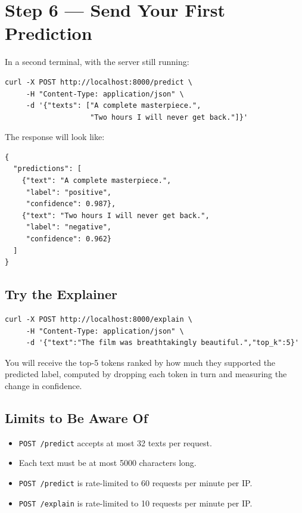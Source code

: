 \documentclass[11pt,a4paper]{article}
\begin{document}
\section{Step 6 --- Send Your First Prediction}

In a second terminal, with the server still running:

\begin{lstlisting}
curl -X POST http://localhost:8000/predict \
     -H "Content-Type: application/json" \
     -d '{"texts": ["A complete masterpiece.",
                    "Two hours I will never get back."]}'
\end{lstlisting}

\noindent The response will look like:

\begin{lstlisting}
{
  "predictions": [
    {"text": "A complete masterpiece.",
     "label": "positive",
     "confidence": 0.987},
    {"text": "Two hours I will never get back.",
     "label": "negative",
     "confidence": 0.962}
  ]
}
\end{lstlisting}

\subsection{Try the Explainer}

\begin{lstlisting}
curl -X POST http://localhost:8000/explain \
     -H "Content-Type: application/json" \
     -d '{"text":"The film was breathtakingly beautiful.","top_k":5}'
\end{lstlisting}

\noindent You will receive the top-5 tokens ranked by how much they supported the
predicted label, computed by dropping each token in turn and measuring the change
in confidence.

\subsection{Limits to Be Aware Of}

\begin{itemize}[leftmargin=*]
\item \texttt{POST /predict} accepts at most 32 texts per request.
\item Each text must be at most 5000 characters long.
\item \texttt{POST /predict} is rate-limited to 60 requests per minute per IP.
\item \texttt{POST /explain} is rate-limited to 10 requests per minute per IP.
\end{itemize}
\end{document}
